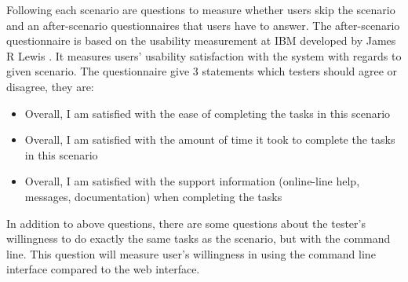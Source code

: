 Following each scenario are questions to measure whether users skip the scenario and an after-scenario questionnaires that users have to answer. The after-scenario questionnaire is based on the usability measurement at IBM developed by James R Lewis \citep{lewis1995ibm}.  It measures users' usability satisfaction with the system with regards to given scenario. The questionnaire give 3 statements which testers should agree or disagree, they are:

\begin{itemize}
	\item Overall, I am satisfied with the ease of completing the tasks in this scenario
	\item Overall, I am satisfied with the amount of time it took to complete the tasks in this scenario
	\item Overall, I am satisfied with the support information (online-line help, messages, documentation) when completing the tasks
\end{itemize}

In addition to above questions, there are some questions about the tester's willingness to do exactly the same tasks as the scenario, but with the command line. This question will measure user's willingness in using the command line interface compared to the web interface. 


